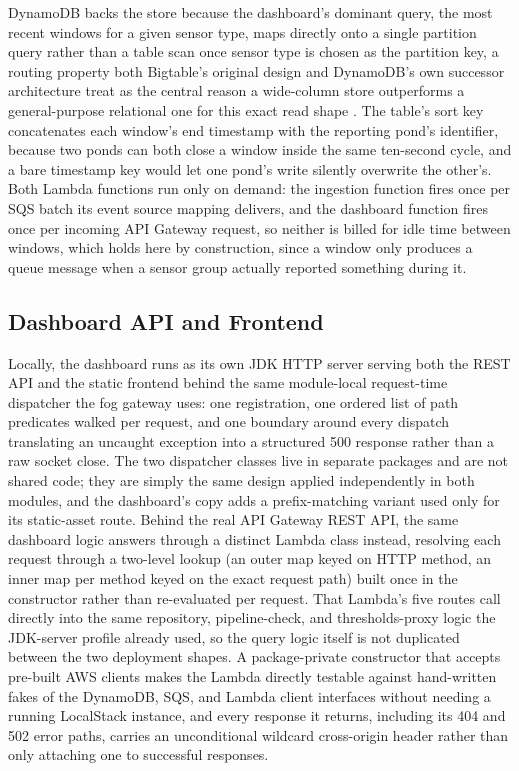 \documentclass[conference]{IEEEtran}
\begin{document}
DynamoDB backs the store because the dashboard's dominant query, the most recent windows for a given sensor type, maps directly onto a single partition query rather than a table scan once sensor type is chosen as the partition key, a routing property both Bigtable's original design and DynamoDB's own successor architecture treat as the central reason a wide-column store outperforms a general-purpose relational one for this exact read shape \cite{ref11}\cite{ref12}. The table's sort key concatenates each window's end timestamp with the reporting pond's identifier, because two ponds can both close a window inside the same ten-second cycle, and a bare timestamp key would let one pond's write silently overwrite the other's. Both Lambda functions run only on demand: the ingestion function fires once per SQS batch its event source mapping delivers, and the dashboard function fires once per incoming API Gateway request, so neither is billed for idle time between windows, which holds here by construction, since a window only produces a queue message when a sensor group actually reported something during it.

\subsection{Dashboard API and Frontend}

Locally, the dashboard runs as its own JDK HTTP server serving both the REST API and the static frontend behind the same module-local request-time dispatcher the fog gateway uses: one registration, one ordered list of path predicates walked per request, and one boundary around every dispatch translating an uncaught exception into a structured 500 response rather than a raw socket close. The two dispatcher classes live in separate packages and are not shared code; they are simply the same design applied independently in both modules, and the dashboard's copy adds a prefix-matching variant used only for its static-asset route. Behind the real API Gateway REST API, the same dashboard logic answers through a distinct Lambda class instead, resolving each request through a two-level lookup (an outer map keyed on HTTP method, an inner map per method keyed on the exact request path) built once in the constructor rather than re-evaluated per request. That Lambda's five routes call directly into the same repository, pipeline-check, and thresholds-proxy logic the JDK-server profile already used, so the query logic itself is not duplicated between the two deployment shapes. A package-private constructor that accepts pre-built AWS clients makes the Lambda directly testable against hand-written fakes of the DynamoDB, SQS, and Lambda client interfaces without needing a running LocalStack instance, and every response it returns, including its 404 and 502 error paths, carries an unconditional wildcard cross-origin header rather than only attaching one to successful responses.
\end{document}
